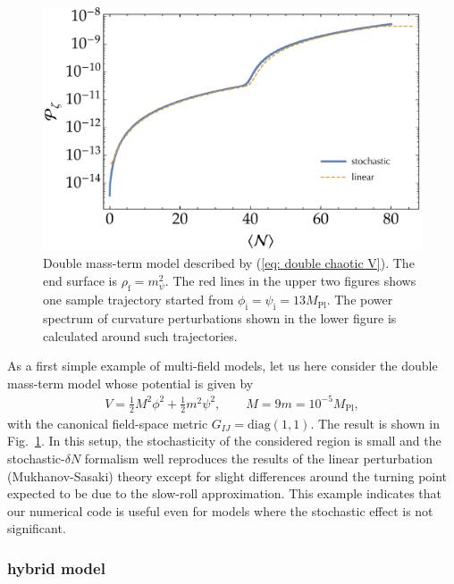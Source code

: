 \documentclass[aps, prd
, preprint
, nofootinbib 
, longbibliography
]{revtex4-1}
\newcommand{\diag}{\mathrm{diag}}
\newcommand{\Mpl}{M_\text{Pl}}
\newcommand{\uf}{\text{f}}
\newcommand{\ui}{\text{i}}
\newcommand{\bae}[1]{\begin{align} #1 \end{align}}
\begin{document}
\begin{figure}
	\includegraphics[width=0.5\hsize]{figs/double_chaotic/Pzeta_conf.pdf}
	\caption{Double mass-term model described by (\ref{eq: double chaotic V}). The end surface is $\rho_\uf=m_\psi^2$.
	The red lines in the upper two figures shows one sample trajectory started from $\phi_\ui=\psi_\ui=13\Mpl$. The power spectrum of curvature perturbations
	shown in the lower figure is calculated around such trajectories.}
	\label{figs: double_chaotic_conf}
\end{figure}

As a first simple example of multi-field models, let us here consider the double mass-term model whose potential is given by
\bae{\label{eq: double chaotic V}
	V=\frac{1}{2}M^2\phi^2+\frac{1}{2}m^2\psi^2, \qquad M=9m=10^{-5}\Mpl,
}
with the canonical field-space metric $G_{IJ}=\diag(1,1)$. The result is shown in Fig.~\ref{figs: double_chaotic_conf}.
In this setup, the stochasticity of the considered region is small and the stochastic-$\delta N$ formalism well reproduces
the results of the linear perturbation (Mukhanov-Sasaki) theory 
except for slight differences around the turning point expected to be due to the slow-roll approximation.
This example indicates that our numerical code is useful even for models where the stochastic effect is not significant.



\subsubsection{hybrid model}
\end{document}
